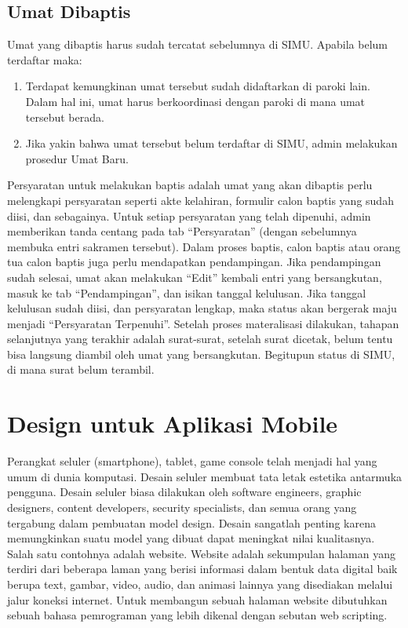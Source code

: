 \subsection{Umat Dibaptis}
\label{sec:umatDibaptis}
Umat yang dibaptis harus sudah tercatat sebelumnya di SIMU. Apabila belum terdaftar maka:

\begin{enumerate}
	\item Terdapat kemungkinan umat tersebut sudah didaftarkan di paroki lain. Dalam hal ini, umat harus berkoordinasi dengan paroki di mana umat tersebut berada.
	\item Jika yakin bahwa umat tersebut belum terdaftar di SIMU, admin melakukan prosedur Umat Baru.
\end{enumerate}

Persyaratan untuk melakukan baptis adalah umat yang akan dibaptis perlu melengkapi persyaratan seperti akte kelahiran, formulir calon baptis yang sudah diisi, dan sebagainya. Untuk setiap persyaratan yang telah dipenuhi, admin memberikan tanda centang pada tab “Persyaratan” (dengan sebelumnya membuka entri sakramen tersebut). Dalam proses baptis, calon baptis atau orang tua calon baptis juga perlu mendapatkan pendampingan. Jika pendampingan sudah selesai, umat akan melakukan “Edit” kembali entri yang bersangkutan, masuk ke tab “Pendampingan”, dan isikan tanggal kelulusan. Jika tanggal kelulusan sudah diisi, dan persyaratan lengkap, maka status akan bergerak maju menjadi “Persyaratan Terpenuhi”.
Setelah proses materalisasi dilakukan, tahapan selanjutnya yang terakhir adalah surat-surat, setelah surat dicetak, belum tentu bisa langsung diambil oleh umat yang bersangkutan. Begitupun status di SIMU, di mana surat belum terambil. 

\section{Design untuk Aplikasi Mobile}
\label{sec:designMobility}
Perangkat seluler (smartphone), tablet, game console telah menjadi hal yang umum di dunia komputasi. Desain seluler membuat tata letak estetika antarmuka pengguna. Desain seluler biasa dilakukan oleh software engineers, graphic designers, content developers, security specialists, dan semua orang yang tergabung dalam pembuatan model design. Desain sangatlah penting karena memungkinkan suatu model yang dibuat dapat meningkat nilai kualitasnya. Salah satu contohnya adalah website. Website adalah sekumpulan halaman yang terdiri dari beberapa laman yang berisi informasi dalam bentuk data digital baik berupa text, gambar, video, audio, dan animasi lainnya yang disediakan melalui jalur koneksi internet. Untuk membangun sebuah halaman website dibutuhkan sebuah bahasa pemrograman yang lebih dikenal dengan sebutan web scripting. \cite{batubara2015perancangan}

